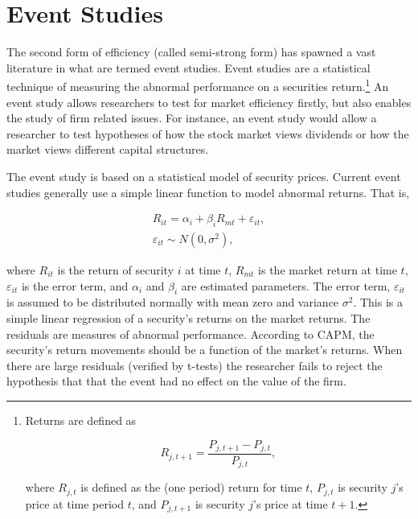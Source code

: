 \section{Event Studies}

The second form of efficiency (called semi-strong form) has spawned a vast literature in what are termed event studies. Event studies are a statistical technique of measuring the abnormal performance on a securities return.\footnote{Returns are defined as

\begin{equation}
R_{j,t+1}=\frac{P_{j,t+1}-P_{j,t}}{P_{j,t}},
\end{equation}

where $R_{j,t}$ is defined as the (one period) return for time $t$, $P_{j,t}$ is security $j$'s price at time period $t$, and $P_{j,t+1}$ is security $j$'s price at time $t+1$.} An event study allows researchers to test for market efficiency firstly, but also enables the study of firm related issues. For instance, an event study would allow a researcher to test hypotheses of how the stock market views dividends or how the market views different capital structures.
 

The event study is based on a statistical model of security prices. Current event studies generally use a simple linear function to model abnormal returns. That is,

\begin{eqnarray}
R_{it}=\alpha_i+\beta_i R_{mt}+\varepsilon_{it}, \\
\varepsilon_{it} \sim N(0,\sigma^{2}),
\end{eqnarray}

where $R_{it}$ is the return of security $i$ at time $t$, $R_{mt}$ is the market return at time $t$, $\varepsilon_{it}$ is the error term, and $\alpha_i$ and $\beta_i$ are estimated parameters. The error term, $\varepsilon_{it}$ is assumed to be distributed normally with mean zero and variance $\sigma^{2}$. This is a simple linear regression of a security's returns on the market returns. The residuals are measures of abnormal performance. According to CAPM, the security's return movements should be a function of the market's returns. When there are large residuals (verified by t-tests) the researcher fails to reject the hypothesis that that the event had no effect on the value of the firm.

